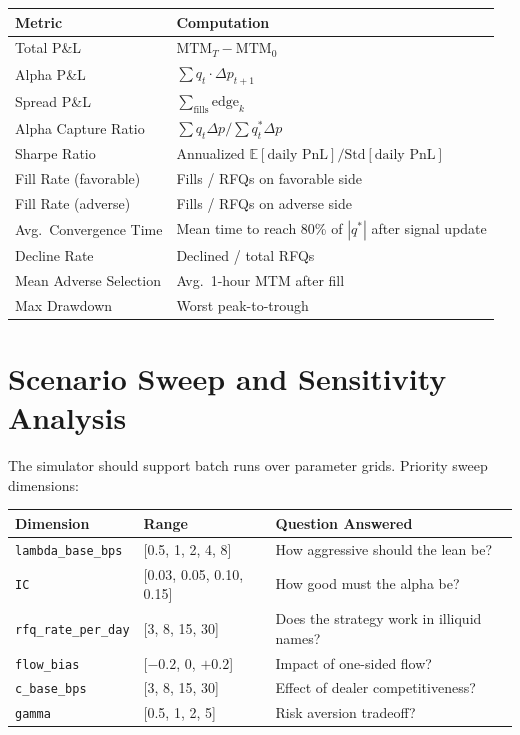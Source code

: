 \documentclass[11pt,a4paper]{article}
\begin{document}
\begin{table}[h!]
\centering\small
\begin{tabular}{@{}ll@{}}
\toprule
\textbf{Metric} & \textbf{Computation} \\
\midrule
Total P\&L & $\text{MTM}_T - \text{MTM}_0$ \\
Alpha P\&L & $\sum q_t \cdot \Delta p_{t+1}$ \\
Spread P\&L & $\sum_{\text{fills}} \text{edge}_k$ \\
Alpha Capture Ratio & $\sum q_t \Delta p / \sum q^*_t \Delta p$ \\
Sharpe Ratio & Annualized $\mathbb{E}[\text{daily PnL}] / \text{Std}[\text{daily PnL}]$ \\
Fill Rate (favorable) & Fills / RFQs on favorable side \\
Fill Rate (adverse) & Fills / RFQs on adverse side \\
Avg.\ Convergence Time & Mean time to reach 80\% of $|q^*|$ after signal update \\
Decline Rate & Declined / total RFQs \\
Mean Adverse Selection & Avg.\ 1-hour MTM after fill \\
Max Drawdown & Worst peak-to-trough \\
\bottomrule
\end{tabular}
\end{table}


\section{Scenario Sweep and Sensitivity Analysis}

The simulator should support batch runs over parameter grids. Priority sweep dimensions:

\begin{table}[h!]
\centering\small
\begin{tabular}{@{}lll@{}}
\toprule
\textbf{Dimension} & \textbf{Range} & \textbf{Question Answered} \\
\midrule
\texttt{lambda\_base\_bps} & [0.5, 1, 2, 4, 8] & How aggressive should the lean be? \\
\texttt{IC} & [0.03, 0.05, 0.10, 0.15] & How good must the alpha be? \\
\texttt{rfq\_rate\_per\_day} & [3, 8, 15, 30] & Does the strategy work in illiquid names? \\
\texttt{flow\_bias} & [$-0.2$, 0, $+0.2$] & Impact of one-sided flow? \\
\texttt{c\_base\_bps} & [3, 8, 15, 30] & Effect of dealer competitiveness? \\
\texttt{gamma} & [0.5, 1, 2, 5] & Risk aversion tradeoff? \\
\bottomrule
\end{tabular}
\end{table}
\end{document}
